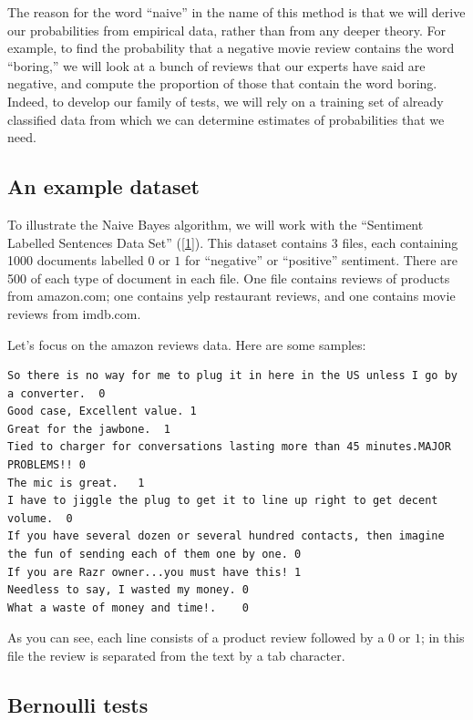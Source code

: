 \documentclass[
]{article}
\begin{document}
The reason for the word ``naive'' in the name of this method is that we
will derive our probabilities from empirical data, rather than from any
deeper theory. For example, to find the probability that a negative
movie review contains the word ``boring,'' we will look at a bunch of
reviews that our experts have said are negative, and compute the
proportion of those that contain the word boring. Indeed, to develop our
family of tests, we will rely on a training set of already classified
data from which we can determine estimates of probabilities that we
need.

\hypertarget{an-example-dataset}{%
\subsection{An example dataset}\label{an-example-dataset}}

To illustrate the Naive Bayes algorithm, we will work with the
``Sentiment Labelled Sentences Data Set''
({[}\protect\hyperlink{ref-sentences}{1}{]}). This dataset contains 3
files, each containing 1000 documents labelled \(0\) or \(1\) for
``negative'' or ``positive'' sentiment. There are 500 of each type of
document in each file. One file contains reviews of products from
amazon.com; one contains yelp restaurant reviews, and one contains movie
reviews from imdb.com.

Let's focus on the amazon reviews data. Here are some samples:

\begin{lstlisting}
So there is no way for me to plug it in here in the US unless I go by a converter.  0
Good case, Excellent value. 1
Great for the jawbone.  1
Tied to charger for conversations lasting more than 45 minutes.MAJOR PROBLEMS!! 0
The mic is great.   1
I have to jiggle the plug to get it to line up right to get decent volume.  0
If you have several dozen or several hundred contacts, then imagine the fun of sending each of them one by one. 0
If you are Razr owner...you must have this! 1
Needless to say, I wasted my money. 0
What a waste of money and time!.    0
\end{lstlisting}

As you can see, each line consists of a product review followed by a
\(0\) or \(1\); in this file the review is separated from the text by a
tab character.

\hypertarget{bernoulli-tests}{%
\subsection{Bernoulli tests}\label{bernoulli-tests}}
\end{document}

